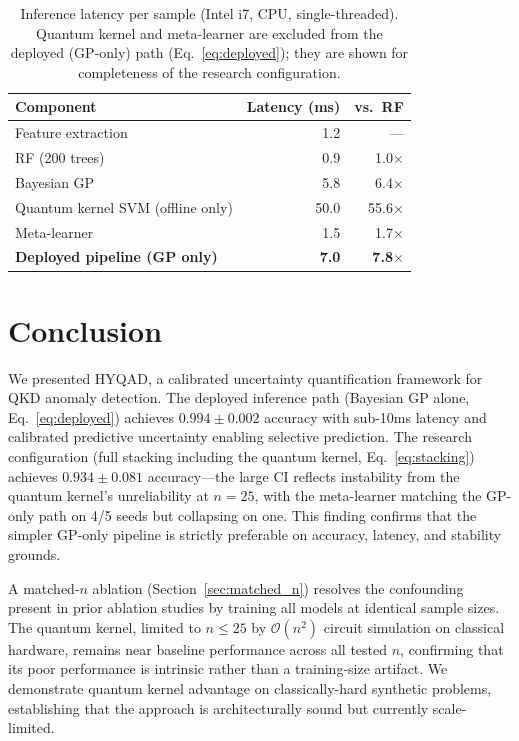 \documentclass[conference,10pt]{IEEEtran}
\begin{document}
\begin{table}[t]
  \centering
  \caption{Inference latency per sample (Intel i7, CPU, single-threaded). Quantum kernel and meta-learner are excluded from the deployed (GP-only) path (Eq.~\ref{eq:deployed}); they are shown for completeness of the research configuration.}
  \label{tab:latency}
  \footnotesize
  \begin{tabular}{lrr}
    \toprule
    \textbf{Component} & \textbf{Latency (ms)} & \textbf{vs.\ RF} \\
    \midrule
    Feature extraction & 1.2 & --- \\
    RF (200 trees) & 0.9 & 1.0$\times$ \\
    Bayesian GP & 5.8 & 6.4$\times$ \\
    Quantum kernel SVM (offline only) & 50.0 & 55.6$\times$ \\
    Meta-learner & 1.5 & 1.7$\times$ \\
    \textbf{Deployed pipeline (GP only)} & \textbf{7.0} & \textbf{7.8$\times$} \\
    \bottomrule
  \end{tabular}
\end{table}

\FloatBarrier

\section{Conclusion}
\label{sec:conclusion}

We presented HYQAD, a calibrated uncertainty quantification framework for QKD anomaly detection. The deployed inference path (Bayesian GP alone, Eq.~\ref{eq:deployed}) achieves $0.994 \pm 0.002$ accuracy with sub-10ms latency and calibrated predictive uncertainty enabling selective prediction. The research configuration (full stacking including the quantum kernel, Eq.~\ref{eq:stacking}) achieves $0.934 \pm 0.081$ accuracy---the large CI reflects instability from the quantum kernel's unreliability at $n = 25$, with the meta-learner matching the GP-only path on 4/5 seeds but collapsing on one. This finding confirms that the simpler GP-only pipeline is strictly preferable on accuracy, latency, and stability grounds.

A matched-$n$ ablation (Section~\ref{sec:matched_n}) resolves the confounding present in prior ablation studies by training all models at identical sample sizes. The quantum kernel, limited to $n \leq 25$ by $\mathcal{O}(n^2)$ circuit simulation on classical hardware, remains near baseline performance across all tested $n$, confirming that its poor performance is intrinsic rather than a training-size artifact. We demonstrate quantum kernel advantage on classically-hard synthetic problems, establishing that the approach is architecturally sound but currently scale-limited.
\end{document}
